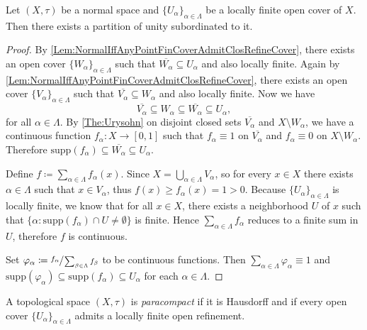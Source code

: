 \documentclass[screen,single]{techreport}
\numberwithin{equation}{section}
\begin{document}
\begin{theorem}\label{The:NormalImplyLocFinCoverAdmitPartiOfUnity}
  Let $(X,\tau)$ be a normal space and $\{U_\alpha\}_{\alpha \in \Lambda}$ be a locally finite open cover of $X$.
  Then there exists a partition of unity subordinated to it.
\end{theorem}
\begin{proof}
  By \cref{Lem:NormalIffAnyPointFinCoverAdmitClosRefineCover}, there exists an open cover $\{W_\alpha\}_{\alpha \in \Lambda}$ such that $\overline{W_\alpha} \subseteq U_\alpha$ and also locally finite.
  Again by \cref{Lem:NormalIffAnyPointFinCoverAdmitClosRefineCover}, there exists an open cover $\{V_\alpha\}_{\alpha \in \Lambda}$ such that $\overline{V_\alpha} \subseteq W_\alpha$ and also locally finite.
  Now we have
  \[
  \overline{V_\alpha} \subseteq W_\alpha \subseteq \overline{W_\alpha} \subseteq U_\alpha,
  \]
  for all $\alpha \in \Lambda$.
  By \cref{The:Urysohn} on disjoint closed sets $\overline{V_\alpha}$ and $X \setminus W_\alpha$, we have a continuous function $f_\alpha : X \to [0,1]$ such that $f_\alpha \equiv 1$ on $\overline{V_\alpha}$ and $f_\alpha \equiv 0$ on $X \setminus W_\alpha$.
  Therefore $\mathrm{supp}(f_\alpha) \subseteq \overline{W_\alpha} \subseteq U_\alpha$.
  
  Define $f \coloneqq \sum_{\alpha \in \Lambda} f_\alpha(x)$.
  Since $X = \bigcup_{\alpha \in \Lambda} V_\alpha$, so for every $x \in X$ there exists $\alpha \in \Lambda$ such that $x \in V_\alpha$, thus $f(x) \ge f_\alpha(x) = 1 > 0$.
  Because $\{U_\alpha\}_{\alpha \in \Lambda}$ is locally finite, we know that for all $x \in X$, there exists a neighborhood $U$ of $x$ such that $\{ \alpha : \mathrm{supp}(f_\alpha) \cap U \neq \emptyset \}$ is finite.
  Hence $\sum_{\alpha \in \Lambda} f_\alpha$ reduces to a finite sum in $U$, therefore $f$ is continuous.
  
  Set $\varphi_\alpha \coloneqq \sfrac{f_\alpha}{\sum_{\beta \in \Lambda} f_\beta}$ to be continuous functions.
  Then $\sum_{\alpha \in \Lambda} \varphi_\alpha \equiv 1$ and $\mathrm{supp}(\varphi_\alpha) \subseteq \mathrm{supp}(f_\alpha) \subseteq U_\alpha$ for each $\alpha \in \Lambda$.
\end{proof}

\begin{definition}\label{De:ParacompactSpace}
  A topological space $(X,\tau)$ is \emph{paracompact} if it is Hausdorff and if every open cover $\{U_\alpha\}_{\alpha \in \Lambda}$ admits a locally finite open refinement.
\end{definition}
\end{document}
